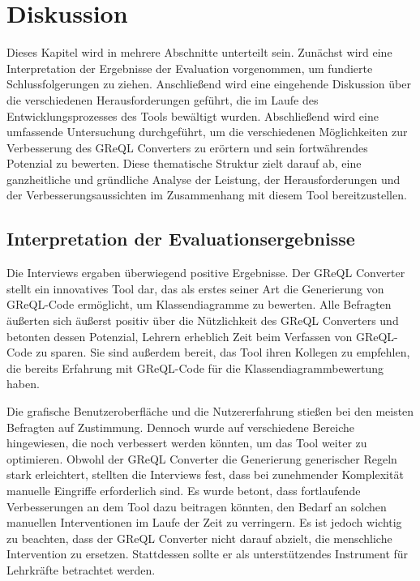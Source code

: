 \chapter{Diskussion}

Dieses Kapitel wird in mehrere Abschnitte unterteilt sein. Zunächst wird eine Interpretation der Ergebnisse der
Evaluation vorgenommen, um fundierte Schlussfolgerungen zu ziehen. Anschließend wird eine eingehende Diskussion über
die verschiedenen Herausforderungen geführt, die im Laufe des Entwicklungsprozesses des Tools bewältigt wurden.
Abschließend wird eine umfassende Untersuchung durchgeführt, um die verschiedenen Möglichkeiten zur Verbesserung des
GReQL Converters zu erörtern und sein fortwährendes Potenzial zu bewerten. Diese thematische Struktur zielt darauf ab,
eine ganzheitliche und gründliche Analyse der Leistung, der Herausforderungen und der Verbesserungsaussichten im
Zusammenhang mit diesem Tool bereitzustellen.

\section{Interpretation der Evaluationsergebnisse}


Die Interviews ergaben überwiegend positive Ergebnisse. Der GReQL Converter stellt ein innovatives Tool dar, das als
erstes seiner Art die Generierung von GReQL-Code ermöglicht, um Klassendiagramme zu bewerten. Alle Befragten äußerten
sich äußerst positiv über die Nützlichkeit des GReQL Converters und betonten dessen Potenzial, Lehrern erheblich Zeit
beim Verfassen von GReQL-Code zu sparen. Sie sind außerdem bereit, das Tool ihren Kollegen zu empfehlen, die bereits
Erfahrung mit GReQL-Code für die Klassendiagrammbewertung haben.

Die grafische Benutzeroberfläche und die Nutzererfahrung stießen bei den meisten Befragten auf Zustimmung.
Dennoch wurde auf verschiedene Bereiche hingewiesen, die noch verbessert werden könnten, um das Tool weiter zu
optimieren. Obwohl der GReQL Converter die Generierung generischer Regeln stark erleichtert, stellten die Interviews
fest, dass bei zunehmender Komplexität manuelle Eingriffe erforderlich sind. Es wurde betont, dass fortlaufende
Verbesserungen an dem Tool dazu beitragen könnten, den Bedarf an solchen manuellen Interventionen im Laufe der Zeit zu
verringern. Es ist jedoch wichtig zu beachten, dass der GReQL Converter nicht darauf abzielt, die menschliche
Intervention zu ersetzen. Stattdessen sollte er als unterstützendes Instrument für Lehrkräfte betrachtet werden.


